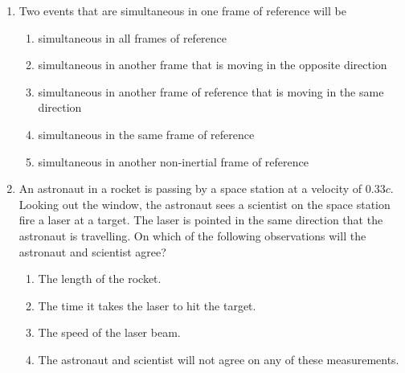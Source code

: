 \begin{enumerate}[itemsep=6pt]
\item Two events that are simultaneous in one frame of reference will be
  \begin{enumerate}
  \item simultaneous in all frames of reference
  \item simultaneous in another frame that is moving in the opposite
    direction
  \item simultaneous in another frame of reference that is moving in the
    same direction 
  \item simultaneous in the same frame of reference
  \item simultaneous in another non-inertial frame of reference
  \end{enumerate}
  
\item An astronaut in a rocket is passing by a space station at a velocity of
  $0.33c$. Looking out the window, the astronaut sees a scientist on the space
  station fire a laser at a target. The laser is pointed in the same direction
  that the astronaut is travelling. On which of the following observations will
  the astronaut and scientist agree?
  \begin{enumerate}
  \item The length of the rocket.
  \item The time it takes the laser to hit the target.
  \item The speed of the laser beam.
  \item The astronaut and scientist will not agree on any of these measurements.
  \end{enumerate}
  

\end{enumerate}
